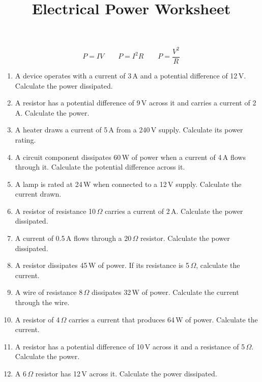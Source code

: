 \documentclass[a4paper,12pt]{article}
\title{Electrical Power Worksheet}
\author{}
\date{}
\begin{document}
\maketitle

\[
P = IV \qquad
P = I^2 R \qquad
P = \frac{V^2}{R}
\]

\begin{enumerate}

\item A device operates with a current of 3\,A and a potential difference of 12\,V. Calculate the power dissipated.

\item A resistor has a potential difference of 9\,V across it and carries a current of 2\,A. Calculate the power.

\item A heater draws a current of 5\,A from a 240\,V supply. Calculate its power rating.

\item A circuit component dissipates 60\,W of power when a current of 4\,A flows through it. Calculate the potential difference across it.

\item A lamp is rated at 24\,W when connected to a 12\,V supply. Calculate the current drawn.

\item A resistor of resistance 10\,$\Omega$ carries a current of 2\,A. Calculate the power dissipated.

\item A current of 0.5\,A flows through a 20\,$\Omega$ resistor. Calculate the power dissipated.

\item A resistor dissipates 45\,W of power. If its resistance is 5\,$\Omega$, calculate the current.

\item A wire of resistance 8\,$\Omega$ dissipates 32\,W of power. Calculate the current through the wire.

\item A resistor of 4\,$\Omega$ carries a current that produces 64\,W of power. Calculate the current.

\item A resistor has a potential difference of 10\,V across it and a resistance of 5\,$\Omega$. Calculate the power.

\item A 6\,$\Omega$ resistor has 12\,V across it. Calculate the power dissipated.


\end{enumerate}
\end{document}
